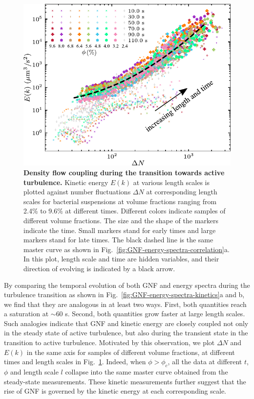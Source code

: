 \begin{figure}[!ht]
\begin{center}
\includegraphics[width=4.5in]{figs/5-GNF/9.pdf}
\caption[Density Flow Coupling during the Transition towards Active Turbulence]
{
\textbf{Density flow coupling during the transition towards active turbulence.}
Kinetic energy $E(k)$ at various length scales is plotted against number fluctuations $\Delta N$ at corresponding length scales for bacterial suspensions at volume fractions ranging from 2.4\% to 9.6\% at different times. Different colors indicate samples of different volume fractions. The size and the shape of the markers indicate the time. Small markers stand for early times and large markers stand for late times. The black dashed line is the same master curve as shown in Fig.~\ref{fig:GNF-energy-spectra-correlation}a. In this plot, length scale and time are hidden variables, and their direction of evolving is indicated by a black arrow.
}
\label{fig:GNF-energy-spectra-correlation-transient}
\end{center}
\end{figure}

By comparing the temporal evolution of both GNF and energy spectra during the turbulence transition as shown in Fig.~\ref{fig:GNF-energy-spectra-kinetics}a and b, we find that they are analogous in at least two ways. First, both quantities reach a saturation at $\sim 60$ s. Second, both quantities grow faster at large length scales. Such analogies indicate that GNF and kinetic energy are  closely coupled not only in the steady state of active turbulence, but also during the transient state in the transition to active turbulence.
Motivated by this observation, we plot $\Delta N$ and $E(k)$ in the same axis for samples of different volume fractions, at different times and length scales in Fig.~\ref{fig:GNF-energy-spectra-correlation-transient}. Indeed, when $\phi>\phi_c$, all the data at different $t$, $\phi$ and length scale $l$ collapse into the same master curve obtained from the steady-state measurements. These kinetic measurements further suggest that the rise of GNF is governed by the kinetic energy at each corresponding scale.



